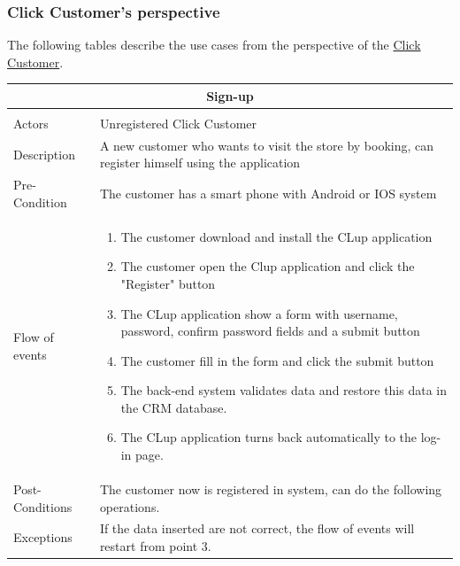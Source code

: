 \documentclass[a4paper,12pt]{report}
\begin{document}
\subsubsection{Click Customer’s perspective}
The following tables describe the use cases from the perspective of the  \hyperref[Definitions]{Click Customer}.
\begin{center}
	\begin{tabular}{p{}|p{}}
		\multicolumn{2}{c}{\large \textbf{Sign-up}} \\[3mm] 
		\hline \\
		Actors &  Unregistered Click Customer \\[3mm]
		Description & A new customer who wants to visit the store by booking, can register himself using the application  \\[3mm] 
		Pre-Condition & The  customer has a smart phone with Android or IOS system \\[3mm]
		Flow of events & 
		\begin{enumerate}
			\item The customer download and install the CLup application
			\item The customer open the Clup application and click the "Register" button
			\item The CLup application show a form with username, password, confirm password fields and a submit button
			\item The customer fill in the form and click the submit button
			\item The back-end system validates data and restore this data in the CRM database.
			\item The CLup application turns back automatically to the log-in page. 
		\end{enumerate}  \\[3mm]
	
		Post-Conditions & The customer now is registered in system, can do the following operations. \\[3mm]
		Exceptions & If the data inserted are not correct, the flow of events will restart from point 3.\\[3mm] 
	\end{tabular}
\end{center}
\end{document}
